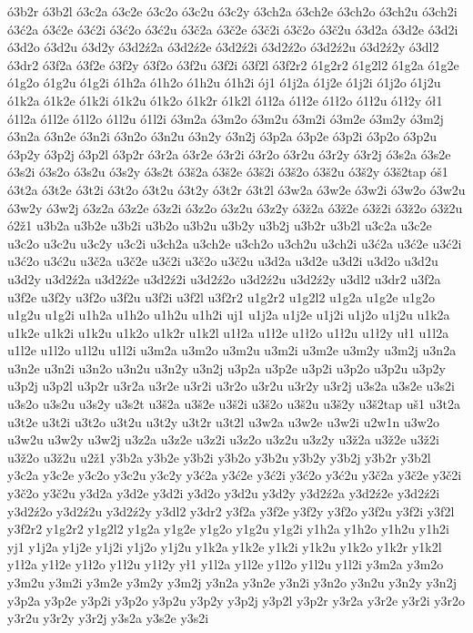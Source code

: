 {ó3b2r
ó3b2l
ó3c2a
ó3c2e
ó3c2o
ó3c2u
ó3c2y
ó3ch2a
ó3ch2e
ó3ch2o
ó3ch2u
ó3ch2i
ó3ć2a
ó3ć2e
ó3ć2i
ó3ć2o
ó3ć2u
ó3č2a
ó3č2e
ó3č2i
ó3č2o
ó3č2u
ó3d2a
ó3d2e
ó3d2i
ó3d2o
ó3d2u
ó3d2y
ó3d2ź2a
ó3d2ź2e
ó3d2ź2i
ó3d2ź2o
ó3d2ź2u
ó3d2ź2y
ó3dl2
ó3dr2
ó3f2a
ó3f2e
ó3f2y
ó3f2o
ó3f2u
ó3f2i
ó3f2l
ó3f2r2
ó1g2r2
ó1g2l2
ó1g2a
ó1g2e
ó1g2o
ó1g2u
ó1g2i
ó1h2a
ó1h2o
ó1h2u
ó1h2i
ój1
ó1j2a
ó1j2e
ó1j2i
ó1j2o
ó1j2u
ó1k2a
ó1k2e
ó1k2i
ó1k2u
ó1k2o
ó1k2r
ó1k2l
ó1ł2a
ó1ł2e
ó1ł2o
ó1ł2u
ó1ł2y
ół1
ó1l2a
ó1l2e
ó1l2o
ó1l2u
ó1l2i
ó3m2a
ó3m2o
ó3m2u
ó3m2i
ó3m2e
ó3m2y
ó3m2j
ó3n2a
ó3n2e
ó3n2i
ó3n2o
ó3n2u
ó3n2y
ó3n2j
ó3p2a
ó3p2e
ó3p2i
ó3p2o
ó3p2u
ó3p2y
ó3p2j
ó3p2l
ó3p2r
ó3r2a
ó3r2e
ó3r2i
ó3r2o
ó3r2u
ó3r2y
ó3r2j
ó3s2a
ó3s2e
ó3s2i
ó3s2o
ó3s2u
ó3s2y
ó3s2t
ó3š2a
ó3š2e
ó3š2i
ó3š2o
ó3š2u
ó3š2y
ó3š2tap
óš1
ó3t2a
ó3t2e
ó3t2i
ó3t2o
ó3t2u
ó3t2y
ó3t2r
ó3t2l
ó3w2a
ó3w2e
ó3w2i
ó3w2o
ó3w2u
ó3w2y
ó3w2j
ó3z2a
ó3z2e
ó3z2i
ó3z2o
ó3z2u
ó3z2y
ó3ž2a
ó3ž2e
ó3ž2i
ó3ž2o
ó3ž2u
ó2ž1
u3b2a
u3b2e
u3b2i
u3b2o
u3b2u
u3b2y
u3b2j
u3b2r
u3b2l
u3c2a
u3c2e
u3c2o
u3c2u
u3c2y
u3c2i
u3ch2a
u3ch2e
u3ch2o
u3ch2u
u3ch2i
u3ć2a
u3ć2e
u3ć2i
u3ć2o
u3ć2u
u3č2a
u3č2e
u3č2i
u3č2o
u3č2u
u3d2a
u3d2e
u3d2i
u3d2o
u3d2u
u3d2y
u3d2ź2a
u3d2ź2e
u3d2ź2i
u3d2ź2o
u3d2ź2u
u3d2ź2y
u3dl2
u3dr2
u3f2a
u3f2e
u3f2y
u3f2o
u3f2u
u3f2i
u3f2l
u3f2r2
u1g2r2
u1g2l2
u1g2a
u1g2e
u1g2o
u1g2u
u1g2i
u1h2a
u1h2o
u1h2u
u1h2i
uj1
u1j2a
u1j2e
u1j2i
u1j2o
u1j2u
u1k2a
u1k2e
u1k2i
u1k2u
u1k2o
u1k2r
u1k2l
u1ł2a
u1ł2e
u1ł2o
u1ł2u
u1ł2y
uł1
u1l2a
u1l2e
u1l2o
u1l2u
u1l2i
u3m2a
u3m2o
u3m2u
u3m2i
u3m2e
u3m2y
u3m2j
u3n2a
u3n2e
u3n2i
u3n2o
u3n2u
u3n2y
u3n2j
u3p2a
u3p2e
u3p2i
u3p2o
u3p2u
u3p2y
u3p2j
u3p2l
u3p2r
u3r2a
u3r2e
u3r2i
u3r2o
u3r2u
u3r2y
u3r2j
u3s2a
u3s2e
u3s2i
u3s2o
u3s2u
u3s2y
u3s2t
u3š2a
u3š2e
u3š2i
u3š2o
u3š2u
u3š2y
u3š2tap
uš1
u3t2a
u3t2e
u3t2i
u3t2o
u3t2u
u3t2y
u3t2r
u3t2l
u3w2a
u3w2e
u3w2i
u2w1n
u3w2o
u3w2u
u3w2y
u3w2j
u3z2a
u3z2e
u3z2i
u3z2o
u3z2u
u3z2y
u3ž2a
u3ž2e
u3ž2i
u3ž2o
u3ž2u
u2ž1
y3b2a
y3b2e
y3b2i
y3b2o
y3b2u
y3b2y
y3b2j
y3b2r
y3b2l
y3c2a
y3c2e
y3c2o
y3c2u
y3c2y
y3ć2a
y3ć2e
y3ć2i
y3ć2o
y3ć2u
y3č2a
y3č2e
y3č2i
y3č2o
y3č2u
y3d2a
y3d2e
y3d2i
y3d2o
y3d2u
y3d2y
y3d2ź2a
y3d2ź2e
y3d2ź2i
y3d2ź2o
y3d2ź2u
y3d2ź2y
y3dl2
y3dr2
y3f2a
y3f2e
y3f2y
y3f2o
y3f2u
y3f2i
y3f2l
y3f2r2
y1g2r2
y1g2l2
y1g2a
y1g2e
y1g2o
y1g2u
y1g2i
y1h2a
y1h2o
y1h2u
y1h2i
yj1
y1j2a
y1j2e
y1j2i
y1j2o
y1j2u
y1k2a
y1k2e
y1k2i
y1k2u
y1k2o
y1k2r
y1k2l
y1ł2a
y1ł2e
y1ł2o
y1ł2u
y1ł2y
ył1
y1l2a
y1l2e
y1l2o
y1l2u
y1l2i
y3m2a
y3m2o
y3m2u
y3m2i
y3m2e
y3m2y
y3m2j
y3n2a
y3n2e
y3n2i
y3n2o
y3n2u
y3n2y
y3n2j
y3p2a
y3p2e
y3p2i
y3p2o
y3p2u
y3p2y
y3p2j
y3p2l
y3p2r
y3r2a
y3r2e
y3r2i
y3r2o
y3r2u
y3r2y
y3r2j
y3s2a
y3s2e
y3s2i
}
